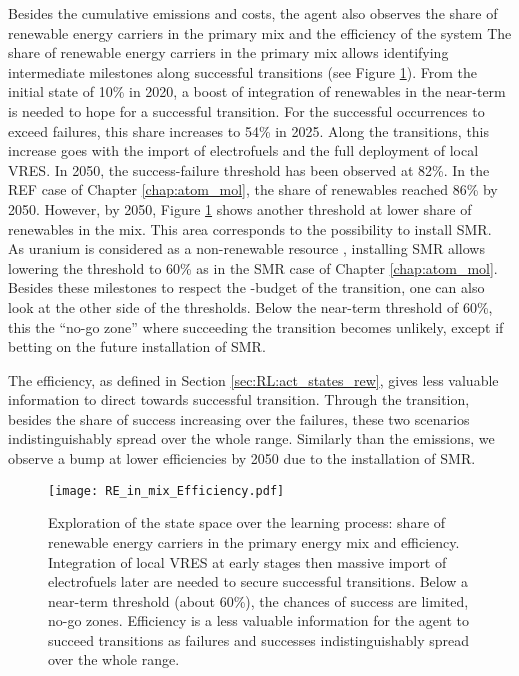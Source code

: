 Besides the cumulative emissions and costs, the agent also observes the share of renewable energy carriers in the primary mix and the efficiency of the system The share of renewable energy carriers in the primary mix allows identifying intermediate milestones along successful transitions (see Figure \ref{fig:RE_in_mix_Efficiency}). From the initial state of 10\% in 2020, a boost of integration of renewables in the near-term is needed to hope for a successful transition. For the successful occurrences to exceed failures, this share increases to 54\% in 2025. Along the transitions, this increase goes with the import of electrofuels and the full deployment of local \gls{VRES}. In 2050, the success-failure threshold has been observed at 82\%. In the REF case of Chapter \ref{chap:atom_mol}, the share of renewables reached 86\% by 2050. However, by 2050, Figure \ref{fig:RE_in_mix_Efficiency} shows another threshold at lower share of renewables in the mix. This area corresponds to the possibility to install \gls{SMR}. As uranium is considered as a non-renewable resource \cite{rixhon2021terminology}, installing \gls{SMR} allows lowering the threshold to 60\% as in the SMR case of Chapter \ref{chap:atom_mol}. Besides these milestones to respect the -budget of the transition, one can also look at the other side of the thresholds. Below the near-term threshold of 60\%, this the ``no-go zone'' where succeeding the transition becomes unlikely, except if betting on the future installation of \gls{SMR}.

The efficiency, as defined in Section \ref{sec:RL:act_states_rew}, gives less valuable information to direct towards successful transition. Through the transition, besides the share of success increasing over the failures, these two scenarios indistinguishably spread over the whole range. Similarly than the emissions, we observe a bump at lower efficiencies by 2050 due to the installation of \gls{SMR}.

\begin{figure}[!htbp]
\centering
\texttt{[image: RE\_in\_mix\_Efficiency.pdf]}
\caption{Exploration of the state space over the learning process: share of renewable energy carriers in the primary energy mix and efficiency. Integration of local \gls{VRES} at early stages then massive import of electrofuels later are needed to secure successful transitions. Below a near-term threshold (about 60\%), the chances of success are limited, \ie no-go zones. Efficiency is a less valuable information for the agent to succeed transitions as failures and successes indistinguishably spread over the whole range.}
\label{fig:RE_in_mix_Efficiency}
\end{figure}

